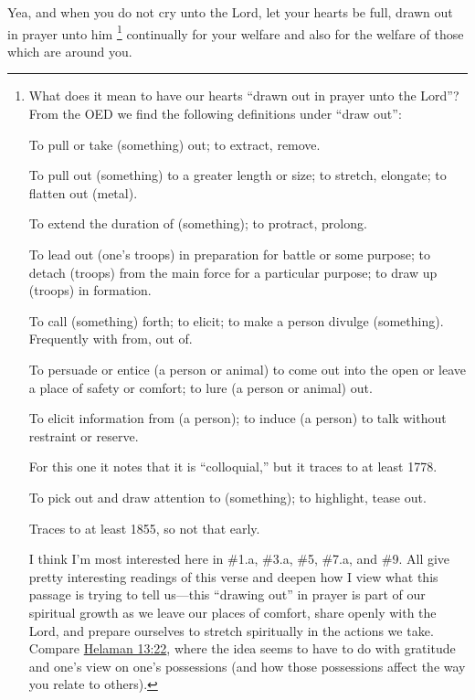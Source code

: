 			Yea, and when you do not cry unto the Lord,
			let your hearts be full, drawn out in prayer unto him%
				\footnote{%
					What does it mean to have our hearts ``drawn out in prayer unto the Lord''? From the OED we find the following definitions under ``draw out'':
						\begin{compactitem}
							\item[1.a] To pull or take (something) out; to extract, remove.
							\item[3.a] To pull out (something) to a greater length or size; to stretch, elongate; to flatten out (metal).
							\item[3.b] To extend the duration of (something); to protract, prolong.
							\item[4.b] To lead out (one's troops) in preparation for battle or some purpose; to detach (troops) from the main force for a particular purpose; to draw up (troops) in formation.
							\item[5] To call (something) forth; to elicit; to make a person divulge (something). Frequently with from, out of.
							\item[7.a] To persuade or entice (a person or animal) to come out into the open or leave a place of safety or comfort; to lure (a person or animal) out.
							\item[9] To elicit information from (a person); to induce (a person) to talk without restraint or reserve.
								\begin{compactitem}
									\item For this one it notes that it is ``colloquial,'' but it traces to at least 1778.
								\end{compactitem}
							\item[11] To pick out and draw attention to (something); to highlight, tease out.
								\begin{compactitem}
									\item Traces to at least 1855, so not that early.
								\end{compactitem}
						\end{compactitem} 
					I think I'm most interested here in \#1.a, \#3.a, \#5, \#7.a, and \#9. All give pretty interesting readings of this verse and deepen how I view what this passage is trying to tell us---this ``drawing out'' in prayer is part of our spiritual growth as we leave our places of comfort, share openly with the Lord, and prepare ourselves to stretch spiritually in the actions we take. Compare \hyperref[HELAMAN-13-22]{Helaman 13:22}, where the idea seems to have to do with gratitude and one's view on one's possessions (and how those possessions affect the way you relate to others).
					}
			continually for your welfare
			and also for the welfare of those which are around you.

